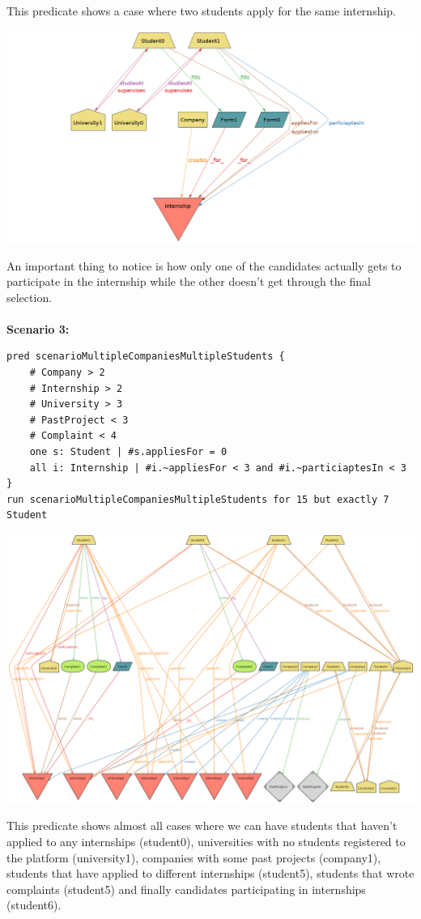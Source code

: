 \documentclass[11pt,twoside]{article}
\begin{document}
This predicate shows a case where two students apply for the same internship.
\begin{center}
\includegraphics[width=\textwidth]{Images/Scenario2}
\end{center}
\newpage
An important thing to notice is how only one of the candidates actually gets to participate in the internship while the other doesn't get through the final selection. \\
\vspace{1\baselineskip} \\
\textbf{Scenario 3:}
{\small
\begin{verbatim}
pred scenarioMultipleCompaniesMultipleStudents {
    # Company > 2
    # Internship > 2
    # University > 3
    # PastProject < 3
    # Complaint < 4
    one s: Student | #s.appliesFor = 0
    all i: Internship | #i.~appliesFor < 3 and #i.~particiaptesIn < 3
}
run scenarioMultipleCompaniesMultipleStudents for 15 but exactly 7 Student
\end{verbatim}}
\begin{center}
\includegraphics[width=\textwidth]{Images/Scenario3}
\end{center}
This predicate shows almost all cases where we can have students that haven't applied to any internships (student0), universities with no students registered to the platform (university1), companies with some past projects (company1), students that have applied to different internships (student5), students that wrote complaints (student5) and finally candidates participating in internships (student6).
\end{document}

